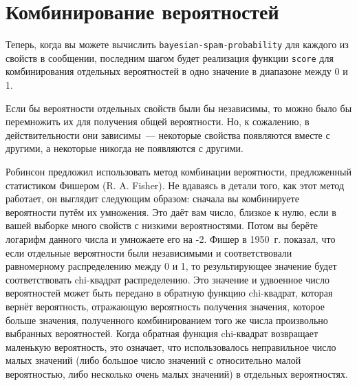 \section{Комбинирование вероятностей}

Теперь, когда вы можете вычислить \lstinline{bayesian-spam-probability} для каждого из свойств
в сообщении, последним шагом будет реализация функции \lstinline{score} для комбинирования
отдельных вероятностей в одно значение в диапазоне между 0 и 1.

Если бы вероятности отдельных свойств были бы независимы, то можно было бы перемножить их
для получения общей вероятности.  Но, к сожалению, в действительности они зависимы~---
некоторые свойства появляются вместе с другими, а некоторые никогда не появляются с
другими.

Робинсон предложил использовать метод комбинации вероятности, предложенный статистиком
Фишером (R. A. Fisher).  Не вдаваясь в детали того, как этот метод работает, он выглядит
следующим образом: сначала вы комбинируете вероятности путём их умножения.  Это даёт вам
число, близкое к нулю, если в вашей выборке много свойств с низкими вероятностями.  Потом
вы берёте логарифм данного числа и умножаете его на -2.  Фишер в 1950~г. показал, что если
отдельные вероятности были независимыми и соответствовали равномерному распределению
между 0 и 1, то результирующее значение будет соответствовать chi-квадрат
распределению. Это значение и удвоенное число вероятностей может быть передано в обратную
функцию chi-квадрат, которая вернёт вероятность, отражающую вероятность получения
значения, которое больше значения, полученного комбинированием того же числа произвольно
выбранных вероятностей.  Когда обратная функция chi-квадрат возвращает маленькую
вероятность, это означает, что использовалось неправильное число малых значений (либо
большое число значений с относительно малой вероятностью, либо несколько очень малых
значений) в отдельных вероятностях.

